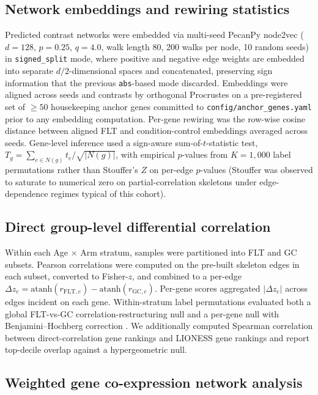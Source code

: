 \documentclass[11pt]{article}
\newcommand{\code}[1]{\texttt{#1}}
\newcommand{\pkg}[1]{\textsf{#1}}
\begin{document}
\subsection{Network embeddings and rewiring statistics}

Predicted contrast networks were embedded via multi-seed \pkg{PecanPy} \pkg{node2vec} \citep{grover2016node2vec, liu2021pecanpy} ($d{=}128$, $p{=}0.25$, $q{=}4.0$, walk length 80, 200 walks per node, 10 random seeds) in \code{signed\_split} mode, where positive and negative edge weights are embedded into separate $d/2$-dimensional spaces and concatenated, preserving sign information that the previous \code{abs}-based mode discarded. Embeddings were aligned across seeds and contrasts by orthogonal Procrustes \citep{schonemann1966procrustes} on a pre-registered set of $\geq 50$ housekeeping anchor genes committed to \code{config/anchor\_genes.yaml} prior to any embedding computation. Per-gene rewiring was the row-wise cosine distance between aligned FLT and condition-control embeddings averaged across seeds. Gene-level inference used a sign-aware sum-of-$t$-statistic test, $T_g = \sum_{e\in N(g)} t_e / \sqrt{|N(g)|}$, with empirical $p$-values from $K{=}1{,}000$ label permutations rather than Stouffer's $Z$ on per-edge $p$-values (Stouffer was observed to saturate to numerical zero on partial-correlation skeletons under edge-dependence regimes typical of this cohort).

\subsection{Direct group-level differential correlation}

Within each Age $\times$ Arm stratum, samples were partitioned into FLT and GC subsets. Pearson correlations were computed on the pre-built skeleton edges in each subset, converted to Fisher-$z$, and combined to a per-edge $\Delta z_e = \mathrm{atanh}(r_{\text{FLT},e}) - \mathrm{atanh}(r_{\text{GC},e})$. Per-gene scores aggregated $|\Delta z_e|$ across edges incident on each gene. Within-stratum label permutations evaluated both a global FLT-vs-GC correlation-restructuring null and a per-gene null with Benjamini--Hochberg correction \citep{benjamini1995controlling}. We additionally computed Spearman correlation between direct-correlation gene rankings and LIONESS gene rankings and report top-decile overlap against a hypergeometric null.

\subsection{Weighted gene co-expression network analysis}
\end{document}
